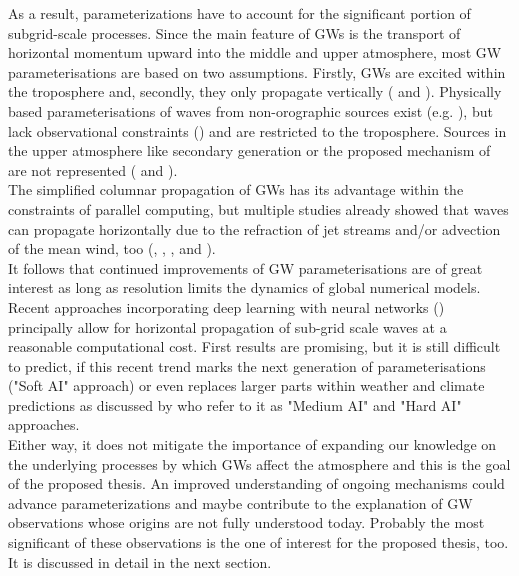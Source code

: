 As a result, parameterizations have to account for the significant portion of subgrid-scale processes. Since the main feature of GWs is the transport of horizontal momentum upward into the middle and upper atmosphere, most GW parameterisations are based on two assumptions. Firstly, GWs are excited within the troposphere and, secondly, they only propagate vertically (\cite{plougonven_how_2020} and \cite{alexander_recent_2010}). Physically based parameterisations of waves from non-orographic sources exist (e.g. \cite{scinocca_accurate_2003}), but lack observational constraints (\cite{plougonven_internal_2014}) and are restricted to the troposphere. Sources in the upper atmosphere like secondary generation or the proposed mechanism of \textcite{dornbrack_stratospheric_2022} are not represented (\cite{plougonven_how_2020} and \cite{kim_overview_2003}). \\
The simplified columnar propagation of GWs has its advantage within the constraints of parallel computing, but multiple studies already showed that waves can propagate horizontally due to the refraction of jet streams and/or advection of the mean wind, too (\cite{dunkerton_inertiagravity_1984}, \cite{preusse_space-based_2002}, \cite{sato_origins_2009}, \cite{sato_gravity_2012} and \cite{ehard_horizontal_2017}). \\ %
It follows that continued improvements of GW parameterisations are of great interest as long as resolution limits the dynamics of global numerical models. Recent approaches incorporating deep learning with neural networks (\cite{matsuoka_application_2020}) principally allow for horizontal propagation of sub-grid scale waves at a reasonable computational cost. First results are promising, but it is still difficult to predict, if this recent trend marks the next generation of parameterisations ("Soft AI" approach) or even replaces larger parts within weather and climate predictions as discussed by \textcite{chantry_opportunities_2021} who refer to it as "Medium AI" and "Hard AI" approaches. \\
Either way, it does not mitigate the importance of expanding our knowledge on the underlying processes by which GWs affect the atmosphere and this is the goal of the proposed thesis. An improved understanding of ongoing mechanisms could advance parameterizations and maybe contribute to the explanation of GW observations whose origins are not fully understood today. Probably the most significant of these observations is the one of interest for the proposed thesis, too. It is discussed in detail in the next section.

